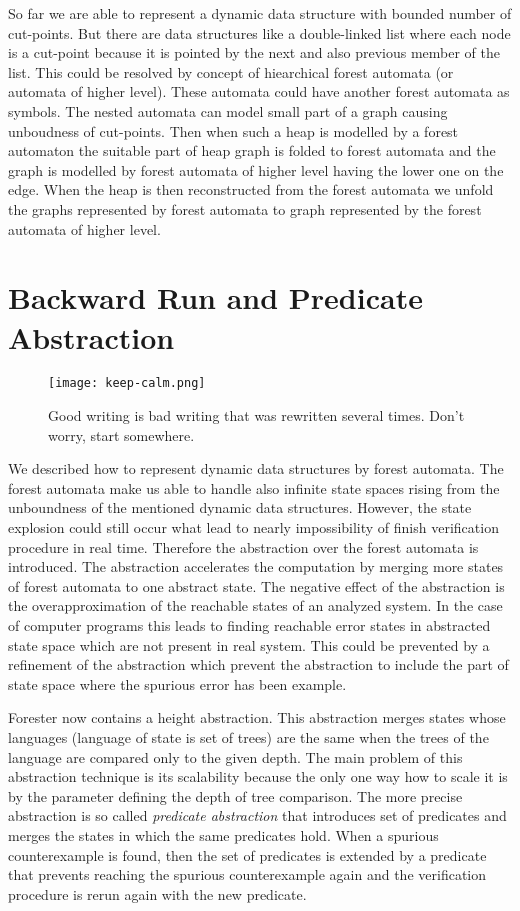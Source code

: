 \documentclass[fleqn,11pt]{ExcelAtFIT} %
\begin{document}
So far we are able to represent a dynamic data structure with bounded number of cut-points.
But there are data structures like a double-linked list where each node is a cut-point because
it is pointed by the next and also previous member of the list.
This could be resolved by concept of hiearchical forest automata (or automata of higher level).
These automata could have another forest automata as symbols.
The nested automata can model small part of a graph causing unboudness of cut-points.
Then when such a heap is modelled by a forest automaton the suitable
part of heap graph is folded to forest automata and the graph is modelled
by forest automata of higher level having the lower one on the edge.
When the heap is then reconstructed from the forest automata we unfold
the graphs represented by forest automata to graph represented by the forest automata
of higher level.

\section{Backward Run and Predicate Abstraction}
\label{sec:br}

\begin{figure}[t]
	\centering
	\texttt{[image: keep-calm.png]}
	\caption{Good writing is bad writing that was rewritten several times.  Don't worry, start somewhere.}
	\label{fig:KeepCalm}
\end{figure}

We described how to represent dynamic data structures by forest automata.
The forest automata make us able to handle also infinite state spaces
rising from the unboundness of the mentioned dynamic data structures.
However, the state explosion could still occur what lead
to nearly impossibility of finish verification procedure in real time.
Therefore the abstraction over the forest automata is introduced.
The abstraction accelerates the computation by merging more states
of forest automata to one abstract state.
The negative effect of the abstraction is the overapproximation of the reachable
states of an analyzed system.
In the case of computer programs this leads to finding reachable error states in
abstracted state space which are not present in real system.
This could be prevented by a refinement of the abstraction
which prevent the abstraction to include the part of state space where
the spurious error has been example.

Forester now contains a height abstraction.
This abstraction merges states whose languages (language of state is set of trees) are the same
when the trees of the language are compared only to the given depth.
The main problem of this abstraction technique is its scalability because
the only one way how to scale it is by the parameter defining the depth of tree comparison.
The more precise abstraction is so called \emph{predicate abstraction} that introduces
set of predicates and merges the states in which the same predicates hold.
When a spurious counterexample is found, then the set of predicates is extended by
a predicate that prevents reaching the spurious counterexample again
and the verification procedure is rerun again with the new predicate.
\end{document}
